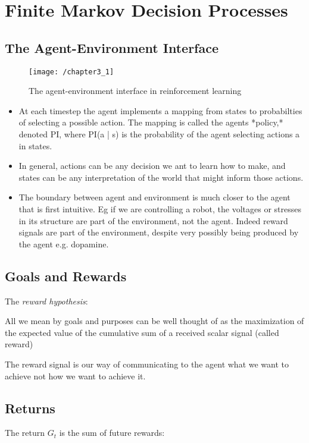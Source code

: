 \section{Finite Markov Decision Processes}

\subsection{The Agent-Environment Interface}
\begin{figure}[h!]
	\centering
	\texttt{[image: /chapter3\_1]}
	\caption{The agent-environment interface in reinforcement learning}
	\label{fig:agent-environment}
\end{figure}

\begin{itemize}
	\item At each timestep the agent implements a mapping from states to probabilties of selecting a possible action. The mapping is called the agents *policy,* denoted PI, where PI(a | s) is the probability of the agent selecting actions a in states.
	\item In general, actions can be any decision we ant to learn how to make, and states can be any interpretation of the world that might inform those actions.
	\item The boundary between agent and environment is much closer to the agent that is first intuitive. Eg if we are controlling a robot, the voltages or stresses in its structure are part of the environment, not the agent. Indeed reward signals are part of the environment, despite very possibly being produced by the agent e.g. dopamine.
\end{itemize}

\subsection{Goals and Rewards}
The \textit{reward hypothesis}:
\begin{displayquote}
	All we mean by goals and purposes can be well thought of as the maximization of the expected value of the cumulative sum of a received scalar signal (called reward)
\end{displayquote}

The reward signal is our way of communicating to the agent what we want to achieve not how we want to achieve it.

\subsection{Returns}
The return \(G_t\) is the sum of future rewards:

